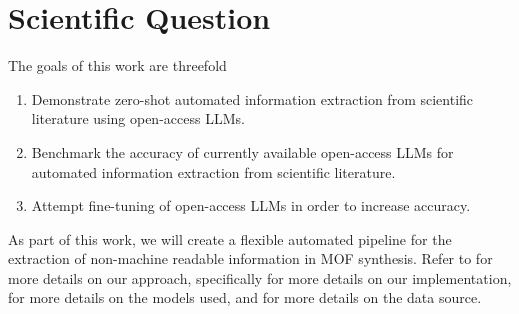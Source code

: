 
\section{Scientific Question}\label{sec:question}

The goals of this work are threefold
\begin{enumerate}
    \item Demonstrate zero-shot automated information extraction from scientific literature using open-access \glspl{LLM}.
    \item Benchmark the accuracy of currently available open-access \glspl{LLM} for automated information extraction from scientific literature.
    \item Attempt fine-tuning of open-access \glspl{LLM} in order to increase accuracy.
\end{enumerate}

As part of this work, we will create a flexible automated pipeline for the extraction of non-machine readable information in \gls{MOF} synthesis.
Refer to  for more details on our approach, specifically  for more details on our implementation,  for more details on the models used, and  for more details on the data source.

